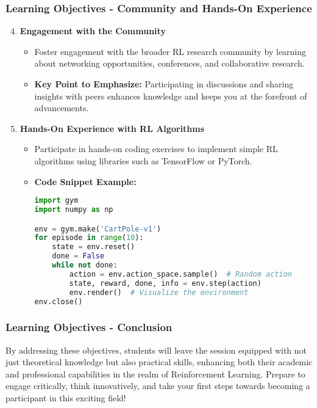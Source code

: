 \documentclass{beamer}
\begin{document}
\begin{frame}[fragile]
    \frametitle{Learning Objectives - Community and Hands-On Experience}
    \begin{enumerate}
        \setcounter{enumi}{3}
        \item \textbf{Engagement with the Community}
        \begin{itemize}
            \item Foster engagement with the broader RL research community by learning about networking opportunities, conferences, and collaborative research.
            \item \textbf{Key Point to Emphasize:} Participating in discussions and sharing insights with peers enhances knowledge and keeps you at the forefront of advancements.
        \end{itemize}

        \item \textbf{Hands-On Experience with RL Algorithms}
        \begin{itemize}
            \item Participate in hands-on coding exercises to implement simple RL algorithms using libraries such as TensorFlow or PyTorch.
            \item \textbf{Code Snippet Example:}
            \begin{lstlisting}[language=Python]
import gym
import numpy as np

env = gym.make('CartPole-v1')
for episode in range(10):
    state = env.reset()
    done = False
    while not done:
        action = env.action_space.sample()  # Random action
        state, reward, done, info = env.step(action)
        env.render()  # Visualize the environment
env.close()
            \end{lstlisting}
        \end{itemize}
    \end{enumerate}
\end{frame}

\begin{frame}[fragile]
    \frametitle{Learning Objectives - Conclusion}
    By addressing these objectives, students will leave the session equipped with not just theoretical knowledge but also practical skills, enhancing both their academic and professional capabilities in the realm of Reinforcement Learning. Prepare to engage critically, think innovatively, and take your first steps towards becoming a participant in this exciting field!
\end{frame}
\end{document}
